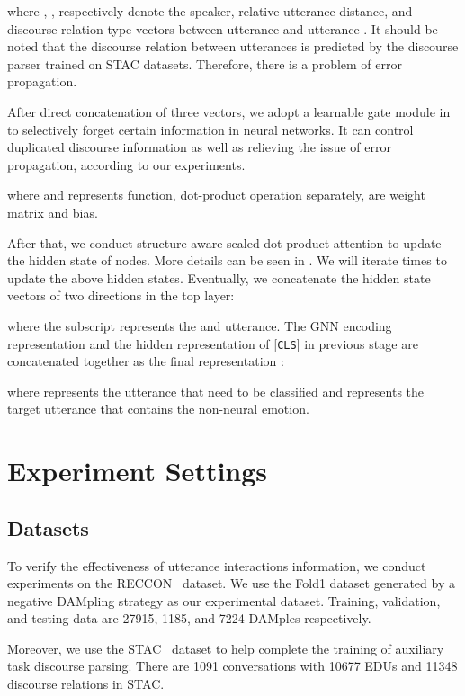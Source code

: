 \documentclass[11pt]{article}
\begin{document}
where , ,  respectively denote the speaker, relative utterance distance, and discourse relation type vectors between utterance  and utterance . 
It should be noted that the discourse relation between utterances is predicted by the discourse parser trained on STAC datasets.
Therefore, there is a problem of error propagation.

After direct concatenation of three vectors, we adopt a learnable gate module in  to selectively forget certain information in neural networks.
It can control duplicated discourse information as well as relieving the issue of error propagation, according to our experiments. 

where  and  represents  function, dot-product operation separately,  are weight matrix and bias.

After that, we conduct structure-aware scaled dot-product attention to update the hidden state of nodes.
More details can be seen in \citet{wang2021structure}. 
We will iterate  times to update the above hidden states.
Eventually, we concatenate the hidden state vectors of two directions  in the top layer:

where the subscript  represents the  and  utterance.
The GNN encoding representation  and the hidden representation  of [\texttt{CLS}] in previous stage are concatenated together as the final representation :

where  represents the  utterance that need to be classified and  represents the target utterance that contains the non-neural emotion.

\section{Experiment Settings}\label{sec:experiments}
\subsection{Datasets}
To verify the effectiveness of utterance interactions information, we conduct experiments on the RECCON~\cite{poria2021recognizing} dataset. 
We use the Fold1 dataset \cite{poria2021recognizing} generated by a negative DAMpling strategy as our experimental dataset. 
Training, validation, and testing data are 27915, 1185, and 7224 DAMples respectively.

Moreover, we use the STAC~\cite{afantenosDiscourseParsingMultiparty2015} dataset to help complete the training of auxiliary task discourse parsing. 
There are 1091 conversations with 10677 EDUs and 11348 discourse relations in STAC.
\end{document}
